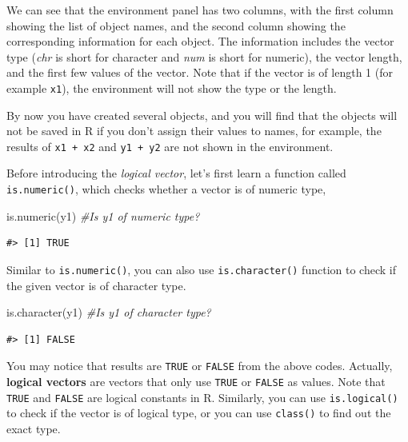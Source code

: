 \documentclass[
]{book}
\newenvironment{Shaded}{\begin{snugshade}}{\end{snugshade}}
\newcommand{\CommentTok}[1]{\textcolor[rgb]{0.56,0.35,0.01}{\textit{#1}}}
\newcommand{\FunctionTok}[1]{\textcolor[rgb]{0.00,0.00,0.00}{#1}}
\newcommand{\NormalTok}[1]{#1}
\newenvironment{infobox}[1]
  {
  \begin{itemize}
  \renewcommand{\labelitemi}{
    \raisebox{-.7\height}[0pt][0pt]{
      {\setkeys{Gin}{width=3em,keepaspectratio}
        \texttt{[image: pics/\#1]}}
    }
  }
  \setlength{\fboxsep}{1em}
  \begin{blackbox}
  \item
  }
  {
  \end{blackbox}
  \end{itemize}
  }
\newenvironment{blackbox}{
  \definecolor{shadecolor}{rgb}{0, 0, 0}  %
  \color{white}
  \begin{shaded}}
 {\end{shaded}}
\begin{document}
We can see that the environment panel has two columns, with the first column showing the list of object names, and the second column showing the corresponding information for each object. The information includes the vector type (\emph{chr} is short for character and \emph{num} is short for numeric), the vector length, and the first few values of the vector. Note that if the vector is of length 1 (for example \texttt{x1}), the environment will not show the type or the length.

\begin{infobox}{caution}
By now you have created several objects, and you will find that the objects will not be saved in R if you don't assign their values to names, for example, the results of \texttt{x1\ +\ x2} and \texttt{y1\ +\ y2} are not shown in the environment.

\end{infobox}

Before introducing the \emph{logical vector}, let's first learn a function called \texttt{is.numeric()}, which checks whether a vector is of numeric type,

\begin{Shaded}
\begin{Highlighting}[]
\FunctionTok{is.numeric}\NormalTok{(y1) }\CommentTok{\#Is y1 of numeric type?}
\end{Highlighting}
\end{Shaded}

\begin{verbatim}
#> [1] TRUE
\end{verbatim}

Similar to \texttt{is.numeric()}, you can also use \texttt{is.character()} function to check if the given vector is of character type.

\begin{Shaded}
\begin{Highlighting}[]
\FunctionTok{is.character}\NormalTok{(y1) }\CommentTok{\#Is y1 of character type?}
\end{Highlighting}
\end{Shaded}

\begin{verbatim}
#> [1] FALSE
\end{verbatim}

You may notice that results are \texttt{TRUE} or \texttt{FALSE} from the above codes. Actually, \textbf{logical vectors} are vectors that only use \texttt{TRUE} or \texttt{FALSE} as values. Note that \texttt{TRUE} and \texttt{FALSE} are logical constants in R. Similarly, you can use \texttt{is.logical()} to check if the vector is of logical type, or you can use \texttt{class()} to find out the exact type.
\end{document}
